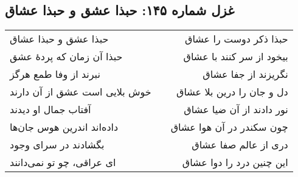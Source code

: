 \begin{center}
\section*{غزل شماره ۱۴۵: حبذا عشق و حبذا عشاق}
\label{sec:145}
\begin{longtable}{l p{0.5cm} r}
حبذا عشق و حبذا عشاق
&&
حبذا ذکر دوست را عشاق
\\
حبذا آن زمان که پردهٔ عشق
&&
بیخود از سر کنند با عشاق
\\
نبرند از وفا طمع هرگز
&&
نگریزند از جفا عشاق
\\
خوش بلایی است عشق از آن دارند
&&
دل و جان را درین بلا عشاق
\\
آفتاب جمال او دیدند
&&
نور دادند از آن ضیا عشاق
\\
داده‌اند اندرین هوس جان‌ها
&&
چون سکندر در آن هوا عشاق
\\
بگشادند در سرای وجود
&&
دری از عالم صفا عشاق
\\
ای عراقی، چو تو نمی‌دانند
&&
این چنین درد را دوا عشاق
\\
\end{longtable}
\end{center}
